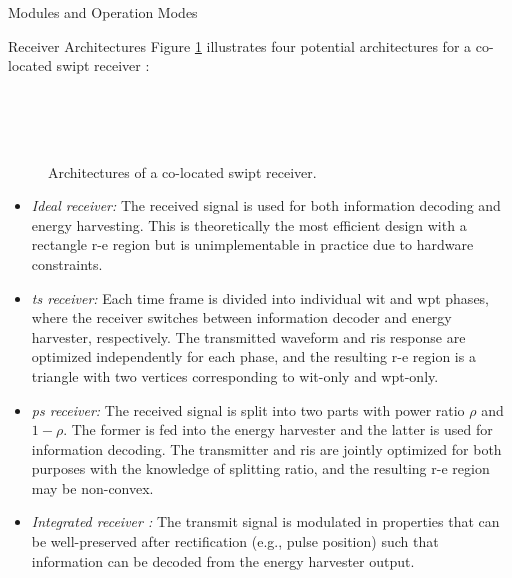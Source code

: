 \begin{section}{}
\begin{subsection}{Modules and Operation Modes}
		\begin{subsubsection}{Receiver Architectures}
			Figure \ref{fg:swipt_receiver_architectures} illustrates four potential architectures for a co-located \gls{swipt} receiver \cite{Clerckx2022}:
			\begin{figure}[H]
				\centering
				\\
				\\
				\\
				\caption{
					Architectures of a co-located \gls{swipt} receiver.
				}
				\label{fg:swipt_receiver_architectures}
			\end{figure}

			\begin{itemize}
				\item \emph{Ideal receiver:} The received signal is used for both information decoding and energy harvesting. This is theoretically the most efficient design with a rectangle \gls{r-e} region but is unimplementable in practice due to hardware constraints.
				\item \emph{\gls{ts} receiver:} Each time frame is divided into individual \gls{wit} and \gls{wpt} phases, where the receiver switches between information decoder and energy harvester, respectively. The transmitted waveform and \gls{ris} response are optimized independently for each phase, and the resulting \gls{r-e} region is a triangle with two vertices corresponding to \gls{wit}-only and \gls{wpt}-only.
				\item \emph{\gls{ps} receiver:} The received signal is split into two parts with power ratio $\rho$ and $1{-}\rho$. The former is fed into the energy harvester and the latter is used for information decoding. The transmitter and \gls{ris} are jointly optimized for both purposes with the knowledge of splitting ratio, and the resulting \gls{r-e} region may be non-convex.
				\item \emph{Integrated receiver \cite{Kim2021a}:} The transmit signal is modulated in properties that can be well-preserved after rectification (e.g., pulse position) such that information can be decoded from the energy harvester output.
			\end{itemize}


\end{subsubsection}
\end{subsection}
\end{section}
